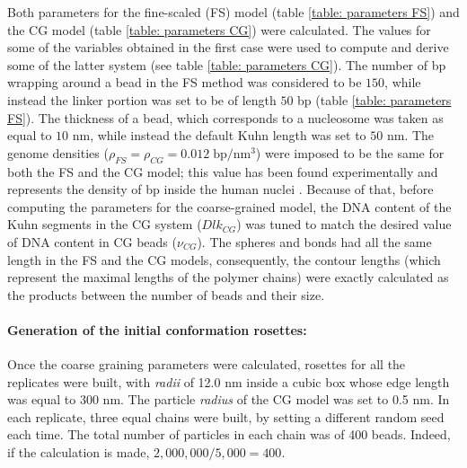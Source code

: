 Both parameters for the fine-scaled (FS) model (table \ref{table: parameters FS}) and the CG model (table \ref{table: parameters CG}) were calculated. The values for some of the variables obtained in the first case were used to compute and derive some of the latter system (see table \ref{table: parameters CG}). The number of bp wrapping around a bead in the FS method was considered to be $150$, while instead the linker portion was set to be of length $50$ bp (table \ref{table: parameters FS}). The thickness of a bead, which corresponds to a nucleosome was taken as equal to $10$ nm, while instead the default Kuhn length was set to $50$ nm. The genome densities ($\rho_{FS} = \rho_{CG} = 0.012\; \text{bp}/\text{nm}^3$) were imposed to be the same for both the FS and the CG model; this value has been found experimentally and represents the density of bp inside the human nuclei
\cite{golkaramRoleChromatinDensity2017}.
Because of that, before computing the parameters for the coarse-grained model, the DNA content of the Kuhn segments in the CG system ($Dlk_{CG}$) was tuned to match the desired value of DNA content in CG beads ($\nu_{CG}$).
The spheres and bonds had all the same length in the FS and the CG models, consequently, the contour lengths (which represent the maximal lengths of the polymer chains) were exactly calculated as the products between the number of beads and their size.


\paragraph{Generation of the initial conformation rosettes:}

Once the coarse graining parameters were calculated, rosettes for all the replicates were built, with \textit{radii} of 12.0 nm inside a cubic box whose edge length was equal to 300 nm. The particle \textit{radius} of the CG model was set to 0.5 nm. In each replicate, three equal chains were built, by setting a different random seed each time. The total number of particles in each chain was of 400 beads. Indeed, if the calculation is made, $2,000,000/5,000 = 400$.



